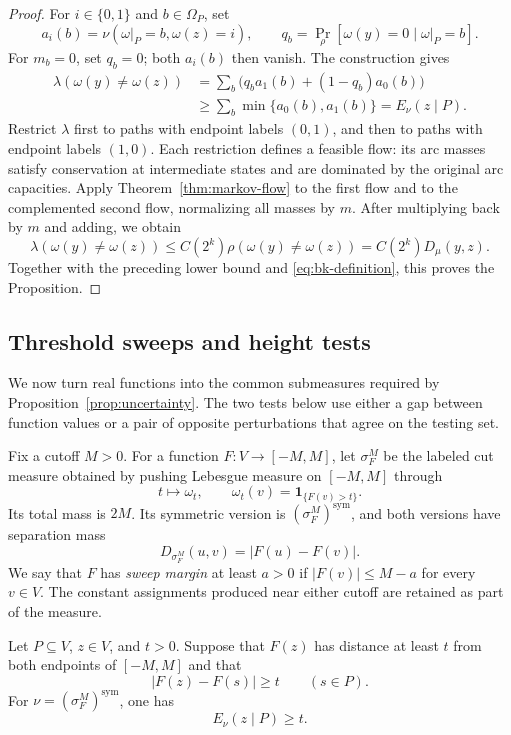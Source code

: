 \begin{proof}
For $i\in\{0,1\}$ and $b\in\Omega_P$, set
\[
 a_i(b)=\nu(\omega|_P=b,\omega(z)=i),
 \qquad
 q_b=\Pr_\rho[\omega(y)=0\mid\omega|_P=b].
\]
For $m_b=0$, set $q_b=0$; both $a_i(b)$ then vanish.
The construction gives
\begin{align*}
 \lambda(\omega(y)\ne\omega(z))
 &=\sum_b\bigl(q_ba_1(b)+(1-q_b)a_0(b)\bigr)\\
 &\geq\sum_b\min\{a_0(b),a_1(b)\}
 =E_\nu(z\mid P).
\end{align*}
Restrict $\lambda$ first to paths with endpoint labels $(0,1)$, and
then to paths with endpoint labels $(1,0)$.
Each restriction defines a feasible flow: its arc masses satisfy
conservation at intermediate states and are dominated by the original
arc capacities.
Apply Theorem~\ref{thm:markov-flow} to the first flow and to the
complemented second flow, normalizing all masses by $m$.
After multiplying back by $m$ and adding, we obtain
\[
 \lambda(\omega(y)\ne\omega(z))
 \leq C(2^k)\rho(\omega(y)\ne\omega(z))
 =C(2^k)D_\mu(y,z).
\]
Together with the preceding lower bound and
\eqref{eq:bk-definition}, this proves the Proposition.
\end{proof}

\subsection{Threshold sweeps and height tests}

We now turn real functions into the common submeasures required by
Proposition~\ref{prop:uncertainty}.  The two tests below use either a
gap between function values or a pair of opposite perturbations that
agree on the testing set.

Fix a cutoff $M>0$.
For a function $F:V\to[-M,M]$, let $\sigma_F^M$ be the labeled cut
measure obtained by pushing Lebesgue measure on $[-M,M]$ through
\[
 t\longmapsto\omega_t,
 \qquad \omega_t(v)=\mathbf{1}_{\{F(v)>t\}}.
\]
Its total mass is $2M$. Its symmetric version is
$(\sigma_F^M)^{\mathrm{sym}}$, and both versions have separation mass
\begin{equation}\label{eq:sweep-separation}
 D_{\sigma_F^M}(u,v)=|F(u)-F(v)|.
\end{equation}
We say that $F$ has \emph{sweep margin} at least $a>0$ if
$|F(v)|\leq M-a$ for every $v\in V$.
The constant assignments produced near either cutoff are retained as
part of the measure.

\begin{lemma}\label{lem:height-gap}
Let $P\subseteq V$, $z\in V$, and $t>0$.
Suppose that $F(z)$ has distance at least $t$ from both endpoints of
$[-M,M]$ and that
\[
 |F(z)-F(s)|\geq t\qquad(s\in P).
\]
For $\nu=(\sigma_F^M)^{\mathrm{sym}}$, one has
\[
 E_\nu(z\mid P)\geq t.
\]
\end{lemma}

